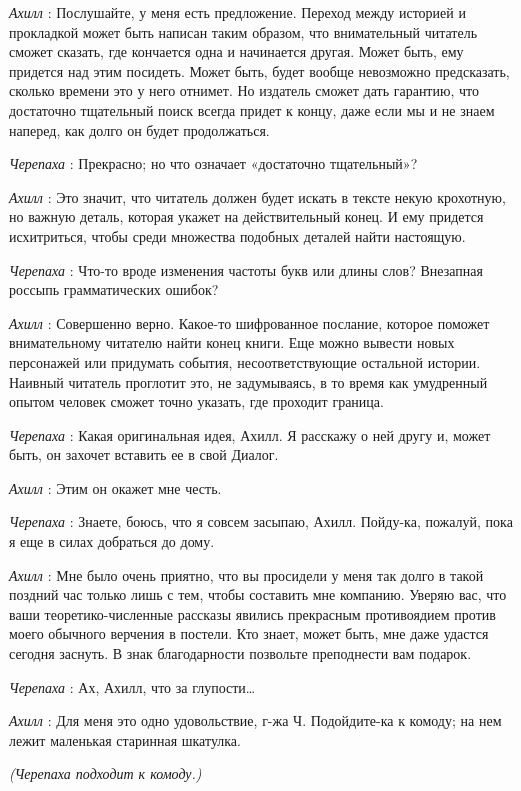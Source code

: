 \documentclass[../main.tex]{subfiles}
\begin{document}
\begin{dialogue}
\emph{Ахилл} : Послушайте, у меня есть предложение. Переход между историей и прокладкой может быть написан таким образом, что внимательный читатель сможет сказать, где кончается одна и начинается другая. Может быть, ему придется над этим посидеть. Может быть, будет вообще невозможно предсказать, сколько времени это у него отнимет. Но издатель сможет дать гарантию, что достаточно тщательный поиск всегда придет к концу, даже если мы и не знаем наперед, как долго он будет продолжаться.

\emph{Черепаха} : Прекрасно; но что означает «достаточно тщательный»?

\emph{Ахилл} : Это значит, что читатель должен будет искать в тексте некую крохотную, но важную деталь, которая укажет на действительный конец. И ему придется исхитриться, чтобы среди множества подобных деталей найти настоящую.

\emph{Черепаха} : Что-то вроде изменения частоты букв или длины слов? Внезапная россыпь грамматических ошибок?

\emph{Ахилл} : Совершенно верно. Какое-то шифрованное послание, которое поможет внимательному читателю найти конец книги. Еще можно вывести новых персонажей или придумать события, несоответствующие остальной истории. Наивный читатель проглотит это, не задумываясь, в то время как умудренный опытом человек сможет точно указать, где проходит граница.

\emph{Черепаха} : Какая оригинальная идея, Ахилл. Я расскажу о ней другу и, может быть, он захочет вставить ее в свой Диалог.

\emph{Ахилл} : Этим он окажет мне честь.

\emph{Черепаха} : Знаете, боюсь, что я совсем засыпаю, Ахилл. Пойду-ка, пожалуй, пока я еще в силах добраться до дому.

\emph{Ахилл} : Мне было очень приятно, что вы просидели у меня так долго в такой поздний час только лишь с тем, чтобы составить мне компанию. Уверяю вас, что ваши теоретико-численные рассказы явились прекрасным противоядием против моего обычного верчения в постели. Кто знает, может быть, мне даже удастся сегодня заснуть. В знак благодарности позвольте преподнести вам подарок.

\emph{Черепаха} : Ах, Ахилл, что за глупости\ldots{}

\emph{Ахилл} : Для меня это одно удовольствие, г-жа Ч. Подойдите-ка к комоду; на нем лежит маленькая старинная шкатулка.

\emph{(Черепаха подходит к комоду.)}


\end{dialogue}
\end{document}
